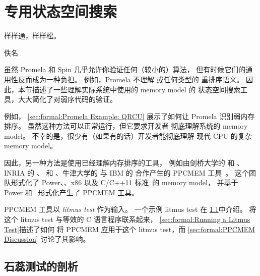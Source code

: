
\section{专用状态空间搜索}
\label{sec:formal:Special-Purpose State-Space Search}
%
\epigraph{样样通，样样松。}{佚名}

虽然 Promela 和 Spin 几乎允许你验证任何（较小的）算法，
但有时候它们的通用性反而成为一种负担。
例如，Promela 不理解  或任何类型的
重排序语义。
因此，本节描述了一些理解实际系统中使用的 memory model 的
状态空间搜索工具，大大简化了对弱序代码的验证。

例如，
\cref{sec:formal:Promela Example: QRCU}
展示了如何让 Promela 识别弱内存排序。
虽然这种方法可以正常运行，但它要求开发者
彻底理解系统的 memory model。
不幸的是，很少有（如果有的话）开发者能彻底理解
现代 CPU 的复杂 memory model。

因此，另一种方法是使用已经理解内存排序的工具，
例如由剑桥大学的  和 、
INRIA 的 、
和 、牛津大学的 
与 IBM 的  合作产生的
PPCMEM 工具~\cite{JadeAlglave2011ppcmem}。
这个团队形式化了 Power、\ARM、x86 以及
C/C++11 标准~\cite{RichardSmith2019N4800}的 memory model，
并基于 Power 和 \ARM\ 形式化产生了 PPCMEM 工具。

\QuickQuizEnd

PPCMEM 工具以 \emph{litmus test} 作为输入。
一个示例 litmus test 在
\cref{sec:formal:Anatomy of a Litmus Test}中介绍。
将这个 litmus test 与等效的 C 语言程序联系起来，
\cref{sec:formal:Running a Litmus Test}描述了如何
将 PPCMEM 应用于这个 litmus test，而
\cref{sec:formal:PPCMEM Discussion}
讨论了其影响。

\subsection{石蕊测试的剖析}
\label{sec:formal:Anatomy of a Litmus Test}

